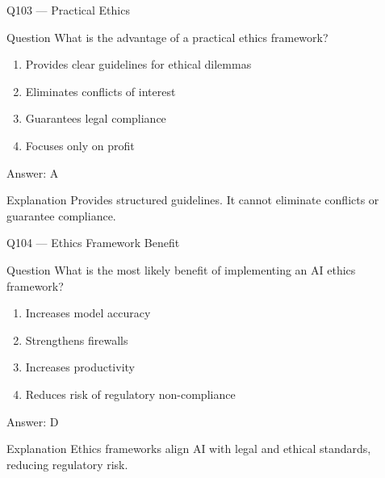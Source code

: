 \documentclass[aspectratio=169,8pt]{beamer}
\begin{document}
	\begin{frame}{Q103 --- Practical Ethics}
		\begin{block}{Question}
			What is the advantage of a practical ethics framework?
		\end{block}
		\begin{enumerate}
			\item Provides clear guidelines for ethical dilemmas
			\item Eliminates conflicts of interest
			\item Guarantees legal compliance
			\item Focuses only on profit
		\end{enumerate}
		\begin{exampleblock}{Answer: A}\end{exampleblock}
		\begin{block}{Explanation}
			Provides structured guidelines. It cannot eliminate conflicts or guarantee compliance.
		\end{block}
	\end{frame}
	
	\begin{frame}{Q104 --- Ethics Framework Benefit}
		\begin{block}{Question}
			What is the most likely benefit of implementing an AI ethics framework?
		\end{block}
		\begin{enumerate}
			\item Increases model accuracy
			\item Strengthens firewalls
			\item Increases productivity
			\item Reduces risk of regulatory non-compliance
		\end{enumerate}
		\begin{exampleblock}{Answer: D}\end{exampleblock}
		\begin{block}{Explanation}
			Ethics frameworks align AI with legal and ethical standards, reducing regulatory risk.
		\end{block}
	\end{frame}
	
\end{document}
